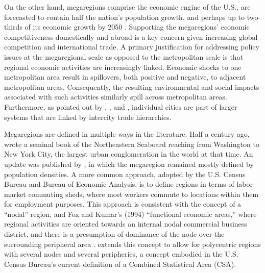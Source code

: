 On the other hand, megaregions comprise the economic engine of the U.S., are forecasted to contain half the nation's population growth, and perhaps up to two-thirds of its economic growth by 2050 \citep{amekudzi07}. Supporting the megaregions' economic competitiveness domestically and abroad is a key concern given increasing global competition and international trade. A primary justification for addressing policy issues at the megaregional scale as opposed to the metropolitan scale is that regional economic activities are increasingly linked. Economic shocks to one metropolitan area result in spillovers, both positive and negative, to adjacent metropolitan areas. Consequently, the resulting environmental and social impacts associated with such activities similarly spill across metropolitan areas. Furthermore, as pointed out by \cite{christaller33}, \cite{losch54}, and \cite{ross09b}, individual cities are part of larger systems that are linked by intercity trade hierarchies.

Megaregions are defined in multiple ways in the literature. Half a century ago, \cite{gottmann61} wrote a seminal book of the Northeastern Seaboard reaching from Washington to New York City, the largest urban conglomeration in the world at that time. An update was published by \citep{gottmann90}, in which the megaregion remained mostly defined by population densities. A more common approach, adopted by the U.S. Census Bureau and Bureau of Economic Analysis, is to define regions in terms of labor market commuting sheds, where most workers commute to locations within them for employment purposes. This approach is consistent with the \cite{hoover95} concept of a ``nodal'' region, and Fox and Kumar's (1994) ``functional economic areas,'' where regional activities are oriented towards an internal nodal commercial business district, and there is a presumption of dominance of the node over the surrounding peripheral area \cite{dawkins03}. \cite{richardson78} extends this concept to allow for polycentric regions with several nodes and several peripheries, a concept embodied in the U.S. Census Bureau's current definition of a Combined Statistical Area (CSA).


